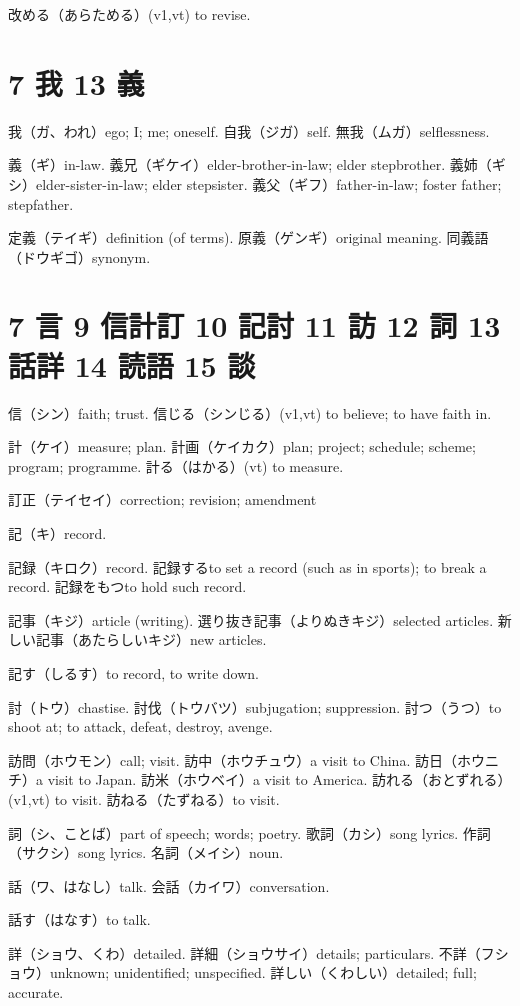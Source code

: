 改める（あらためる）(v1,vt) to revise.

\section{7 我 13 義}

我（ガ、われ）ego; I; me; oneself.
自我（ジガ）self.
無我（ムガ）selflessness.

義（ギ）in-law.
義兄（ギケイ）elder-brother-in-law; elder stepbrother.
義姉（ギシ）elder-sister-in-law; elder stepsister.
義父（ギフ）father-in-law; foster father; stepfather.

定義（テイギ）definition (of terms).
原義（ゲンギ）original meaning.
同義語（ドウギゴ）synonym.

\section{7 言 9 信計訂 10 記討 11 訪 12 詞 13 話詳 14 読語 15 談}

信（シン）faith; trust.
信じる（シンじる）(v1,vt) to believe; to have faith in.

計（ケイ）measure; plan.
計画（ケイカク）plan; project; schedule; scheme; program; programme.
計る（はかる）(vt) to measure.

訂正（テイセイ）correction; revision; amendment

記（キ）record.

記録（キロク）record.
記録するto set a record (such as in sports); to break a record.
記録をもつto hold such record.

記事（キジ）article (writing).
選り抜き記事（よりぬきキジ）selected articles.
新しい記事（あたらしいキジ）new articles.

記す（しるす）to record, to write down.

討（トウ）chastise.
討伐（トウバツ）subjugation; suppression.
討つ（うつ）to shoot at; to attack, defeat, destroy, avenge.

訪問（ホウモン）call; visit.
訪中（ホウチュウ）a visit to China.
訪日（ホウニチ）a visit to Japan.
訪米（ホウベイ）a visit to America.
訪れる（おとずれる）(v1,vt) to visit.
訪ねる（たずねる）to visit.

詞（シ、ことば）part of speech; words; poetry.
歌詞（カシ）song lyrics.
作詞（サクシ）song lyrics.
名詞（メイシ）noun.

話（ワ、はなし）talk.
会話（カイワ）conversation.

話す（はなす）to talk.

詳（ショウ、くわ）detailed.
詳細（ショウサイ）details; particulars.
不詳（フショウ）unknown; unidentified; unspecified.
詳しい（くわしい）detailed; full; accurate.

